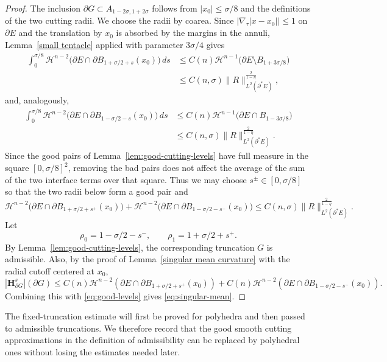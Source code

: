 \documentclass[reqno,11pt]{amsart}
\def\sz{\sigma}
\newcommand{\HH}{\mathscr H}
\numberwithin{equation}{section}
\theoremstyle{remark}
\begin{document}
\begin{proof}
The inclusion $\partial G\subset A_{1-2\sz,1+2\sz}$ follows from
$|x_0|\le\sz/8$ and the definitions of the two cutting radii.  We choose the
radii by coarea. Since $|\nabla_\tau |x-x_0||\le1$ on $\partial E$ and the
translation by $x_0$ is absorbed by the margins in the annuli, Lemma~\ref{small tentacle}
applied with parameter $3\sigma/4$ gives
\begin{align*}
\int_0^{\sz/8}\HH^{n-2}\bigl(\partial E\cap\partial B_{1+\sz/2+s}(x_0)\bigr)\,ds
&\le C(n)\HH^{n-1}\bigl(\partial E\setminus B_{1+3\sz/8}\bigr)\\
&\le C(n,\sz)\|R\|_{L^2(\partial^*E)}^{\frac{2}{1-\eta}},
\end{align*}
and, analogously,
\begin{align*}
\int_0^{\sz/8}\HH^{n-2}\bigl(\partial E\cap\partial B_{1-\sz/2-s}(x_0)\bigr)\,ds
&\le C(n)\HH^{n-1}\bigl(\partial E\cap B_{1-3\sz/8}\bigr)\\
&\le C(n,\sz)\|R\|_{L^2(\partial^*E)}^{\frac{2}{1-\eta}} .
\end{align*}
Since the good pairs of Lemma~\ref{lem:good-cutting-levels} have full measure
in the square $[0,\sz/8]^2$, removing the bad pairs does not affect the
average of the sum of the two interface terms over that square. Thus we may
choose $s^\pm\in[0,\sz/8]$ so that the two radii below form a good pair and
\begin{equation}\label{eq:good-levels}
\HH^{n-2}\bigl(\partial E\cap\partial B_{1+\sz/2+s^+}(x_0)\bigr)
+
\HH^{n-2}\bigl(\partial E\cap\partial B_{1-\sz/2-s^-}(x_0)\bigr)\le C(n,\sz)\|R\|_{L^2(\partial^*E)}^{\frac{2}{1-\eta}} .
\end{equation}
Let
\[
\rho_0=1-\sz/2-s^-,
\qquad
\rho_1=1+\sz/2+s^+ .
\]
By Lemma~\ref{lem:good-cutting-levels}, the corresponding truncation $G$ is
admissible.
Also, by the proof of
Lemma~\ref{singular mean curvature} with the radial cutoff centered at $x_0$,
\[
|\mathbf H^s_{\partial G}|(\partial G)
\le C(n)\HH^{n-2}(\partial E\cap \partial B_{1+\sz/2+s^+}(x_0))
+C(n)\HH^{n-2}(\partial E\cap \partial B_{1-\sz/2-s^-}(x_0)).
\]
Combining this with
\eqref{eq:good-levels} gives \eqref{eq:singular-mean}.
\end{proof}

The fixed-truncation estimate will first be proved for polyhedra and then
passed to admissible truncations. We therefore record that the good smooth
cutting approximations in the definition of admissibility can be replaced by
polyhedral ones without losing the estimates needed later.
\end{document}
